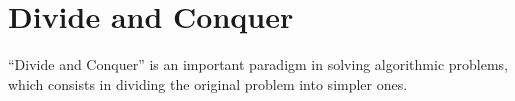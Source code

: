 \section{Divide and Conquer}
\label{addDivideAndConquer}
``Divide and Conquer'' is an important paradigm in solving algorithmic problems, which consists in dividing the original problem into simpler ones.
